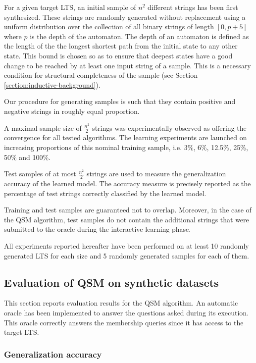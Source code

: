 For a given target LTS, an initial sample of $n^2$ different strings has been first synthesized. These strings are randomly generated without replacement using a uniform distribution over the collection of all binary strings of length $[0, p+5]$ where $p$ is the depth of the automaton. The depth of an automaton is defined as the length of the the longest shortest path from the initial state to any other state. This bound is chosen so as to ensure that deepest states have a good change to be reached by at least one input string of a sample. This is a necessary condition for structural completeness of the sample (see Section \ref{section:inductive-background}). 

Our procedure for generating samples is such that they contain positive and negative strings in roughly equal proportion.
 
A maximal sample size of $\frac{n^2}{2}$ strings was experimentally observed as offering the convergence for all tested algorithms. The learning experiments are launched on increasing proportions of this nominal training sample, i.e. 3\%, 6\%, 12.5\%, 25\%, 50\% and 100\%.

Test samples of at most $\frac{n^2}{2}$ strings are used to measure the generalization accuracy of the learned model. The accuracy measure is precisely reported as the percentage of test strings correctly classified by the learned model.

Training and test samples are guaranteed not to overlap. Moreover, in the case of the QSM algorithm, test samples do not contain the additional strings that were submitted to the oracle during the interactive learning phase.

All experiments reported hereafter have been performed on at least 10 randomly generated LTS for each size and 5 randomly generated samples for each of them.

\subsection{Evaluation of QSM on synthetic datasets\label{subsection:evaluation-synthetic-qsm}}

This section reports evaluation results for the QSM algorithm. An automatic oracle has been implemented to answer the questions asked during its execution. This oracle correctly answers the membership queries since it has access to the target LTS.

\subsubsection*{Generalization accuracy}

